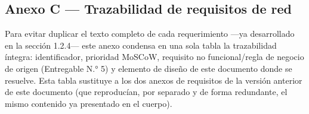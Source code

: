 \documentclass[11pt,a4paper]{article}
\begin{document}
\subsection{Anexo C --- Trazabilidad de requisitos de red}\label{anexo-c-trazabilidad-de-requisitos-de-red}

Para evitar duplicar el texto completo de cada requerimiento ---ya desarrollado en la sección 1.2.4--- este anexo condensa en una sola tabla la trazabilidad íntegra: identificador, prioridad MoSCoW, requisito no funcional/regla de negocio de origen (Entregable N.° 5) y elemento de diseño de este documento donde se resuelve. Esta tabla sustituye a los dos anexos de requisitos de la versión anterior de este documento (que reproducían, por separado y de forma redundante, el mismo contenido ya presentado en el cuerpo).
\end{document}
